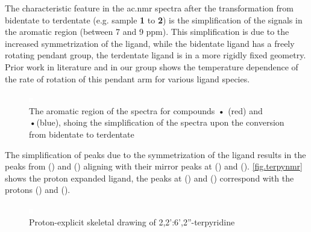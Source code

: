 The characteristic feature in the \gls{ac.nmr} spectra after the transformation from bidentate to terdentate (e.g. sample \textbf{1} to \textbf{2}) is the simplification of the signals in the aromatic region (between 7 and 9 ppm). This simplification is due to the increased symmetrization of the ligand, while the  bidentate ligand has a freely rotating pendant group, the  terdentate ligand is in a more rigidly fixed geometry. Prior work in literature and in our group shows the temperature dependence of the rate of rotation of this pendant arm for various ligand species. 

\begin{figure}[!htbp]
 \begin{center}
  \includegraphics[clip=true]{images/insertgraphic.eps}
 \end{center}
\caption[The aromatic region of the \texorpdfstring{}{1H} spectra showing bidentate - terdentate conversion]{The aromatic region of the \texorpdfstring{}{1H} spectra for compounds \textbf{•} (red) and \textbf{•}(blue), shoing the simplification of the spectra upon the conversion from bidentate to terdentate}
\label{fig.bidtoter}
\end{figure} 

The simplification of peaks due to the symmetrization of the ligand results in the peaks from () and () aligning with their mirror peaks at () and (). \autoref{fig.terpynmr} shows the proton expanded ligand, the peaks at () and () correspond with the protons () and (). 

\begin{figure}[!htbp]
 \begin{center}
  \includegraphics[clip=true]{images/insertgraphic.eps}
 \end{center}
\caption[Proton-explicit skeletal drawing of 2,2':6',2''-terpyridine]{Proton-explicit skeletal drawing of 2,2':6',2''-terpyridine}
\label{fig.termpynmr}
\end{figure} 

